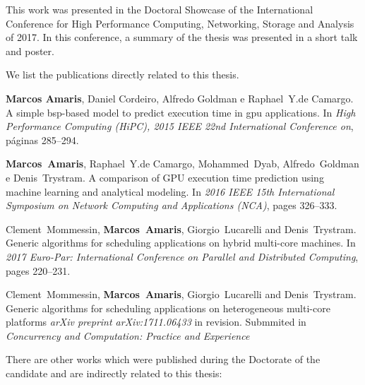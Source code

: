 This work was presented in the Doctoral Showcase of the International Conference for High Performance Computing, Networking, Storage and Analysis of 2017. In this conference, a summary of the thesis was presented in a short talk and poster. 

We list the publications directly related to this thesis. %

\begin{itemize}

{\bf Marcos Amaris}, Daniel Cordeiro, Alfredo Goldman e Raphael~Y.de Camargo.
\newblock A simple bsp-based model to predict execution time in gpu
  applications.
\newblock In \emph{High Performance Computing (HiPC), 2015 IEEE 22nd
  International Conference on}, p\'{a}ginas 285--294.
  
{\bf Marcos~Amaris}, Raphael~Y.de Camargo, Mohammed~Dyab, Alfredo~Goldman e Denis~Trystram.
\newblock A comparison of GPU execution time prediction using machine learning
  and analytical modeling.
\newblock In \emph{2016 IEEE 15th International Symposium on Network Computing
  and Applications (NCA)}, pages 326--333.

Clement~Mommessin, {\bf Marcos~Amaris}, Giorgio~Lucarelli and Denis~Trystram.
\newblock Generic algorithms for scheduling applications on hybrid multi-core
  machines.
\newblock In \emph{2017 Euro-Par: International Conference on Parallel and
  Distributed Computing}, pages 220--231. 
  
Clement~Mommessin, {\bf Marcos~Amaris}, Giorgio~Lucarelli and Denis~Trystram.
\newblock Generic algorithms for scheduling applications on heterogeneous multi-core platforms
\newblock \emph{arXiv preprint arXiv:1711.06433} in revision. Submmited in 
\emph{Concurrency and Computation: Practice and Experience}
\end{itemize}  

There are other works which were published during the Doctorate of the candidate and are indirectly related to this thesis:


